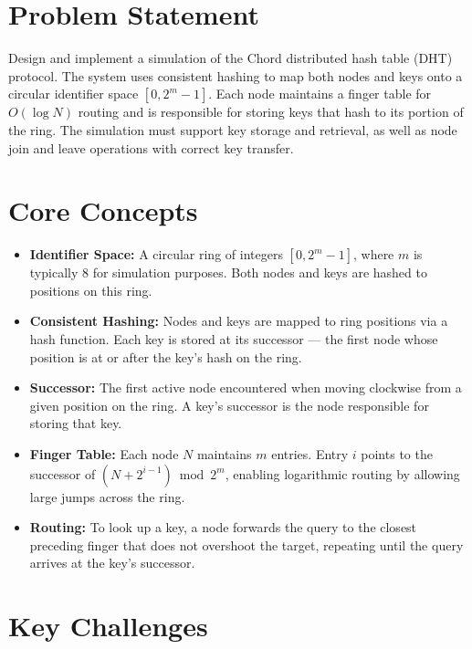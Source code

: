 \section{Problem Statement}

Design and implement a simulation of the Chord distributed hash table (DHT) protocol. The system uses consistent hashing to map both nodes and keys onto a circular identifier space $[0, 2^m - 1]$. Each node maintains a finger table for $O(\log N)$ routing and is responsible for storing keys that hash to its portion of the ring. The simulation must support key storage and retrieval, as well as node join and leave operations with correct key transfer.

\section{Core Concepts}

\begin{itemize}
  \item \textbf{Identifier Space:} A circular ring of integers $[0, 2^m - 1]$, where $m$ is typically 8 for simulation purposes. Both nodes and keys are hashed to positions on this ring.
  \item \textbf{Consistent Hashing:} Nodes and keys are mapped to ring positions via a hash function. Each key is stored at its successor --- the first node whose position is at or after the key's hash on the ring.
  \item \textbf{Successor:} The first active node encountered when moving clockwise from a given position on the ring. A key's successor is the node responsible for storing that key.
  \item \textbf{Finger Table:} Each node $N$ maintains $m$ entries. Entry $i$ points to the successor of $(N + 2^{i-1}) \bmod 2^m$, enabling logarithmic routing by allowing large jumps across the ring.
  \item \textbf{Routing:} To look up a key, a node forwards the query to the closest preceding finger that does not overshoot the target, repeating until the query arrives at the key's successor.
\end{itemize}

\section{Key Challenges}


